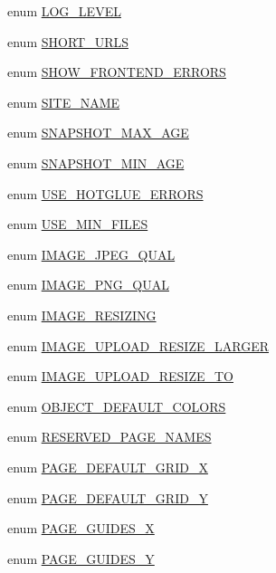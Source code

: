 \begin{DoxyCompactItemize}
\item 
enum \hyperlink{config_8inc_8php_aa5a9053636a30269210c54e734e0d583}{LOG\_\-LEVEL} 
\item 
enum \hyperlink{config_8inc_8php_a377ac3321785e25215435e8d9802bc34}{SHORT\_\-URLS} 
\item 
enum \hyperlink{config_8inc_8php_a71022f94adb600e3984795805fe7f8d0}{SHOW\_\-FRONTEND\_\-ERRORS} 
\item 
enum \hyperlink{config_8inc_8php_a38f8e1265350d7091b55f4cffe629f3a}{SITE\_\-NAME} 
\item 
enum \hyperlink{config_8inc_8php_aa9c8d739795b1000f6ea105992a4e488}{SNAPSHOT\_\-MAX\_\-AGE} 
\item 
enum \hyperlink{config_8inc_8php_a7fb94ff6aaa61e964fe2f90f738d5cb3}{SNAPSHOT\_\-MIN\_\-AGE} 
\item 
enum \hyperlink{config_8inc_8php_a4be2ca4abd0486feb76708f3cf7e671d}{USE\_\-HOTGLUE\_\-ERRORS} 
\item 
enum \hyperlink{config_8inc_8php_a98806af9de0ea41a958d26c7e06b26a9}{USE\_\-MIN\_\-FILES} 
\item 
enum \hyperlink{config_8inc_8php_af27e0280ef96e9b1d2d968a0d2d208ff}{IMAGE\_\-JPEG\_\-QUAL} 
\item 
enum \hyperlink{config_8inc_8php_a3e161cc5c717f2e23d89b69ec297af9b}{IMAGE\_\-PNG\_\-QUAL} 
\item 
enum \hyperlink{config_8inc_8php_a0654894e46ca07417a6e85e091ed7d1d}{IMAGE\_\-RESIZING} 
\item 
enum \hyperlink{config_8inc_8php_a009a803b2fcec74eb8fd6b90dfebd680}{IMAGE\_\-UPLOAD\_\-RESIZE\_\-LARGER} 
\item 
enum \hyperlink{config_8inc_8php_a86484d4f8051155268e7c23ac4d1f5f4}{IMAGE\_\-UPLOAD\_\-RESIZE\_\-TO} 
\item 
enum \hyperlink{config_8inc_8php_a3e205a45d91d7ef191e53487b6b48b3b}{OBJECT\_\-DEFAULT\_\-COLORS} 
\item 
enum \hyperlink{config_8inc_8php_a9b61a7295e29797458d957ae0640c601}{RESERVED\_\-PAGE\_\-NAMES} 
\item 
enum \hyperlink{config_8inc_8php_abc1c54acdbce897c718854b663517cf9}{PAGE\_\-DEFAULT\_\-GRID\_\-X} 
\item 
enum \hyperlink{config_8inc_8php_ab93c5dcea5ef58747b80594c3d9304d7}{PAGE\_\-DEFAULT\_\-GRID\_\-Y} 
\item 
enum \hyperlink{config_8inc_8php_a81167deb206874270a59273141919fe5}{PAGE\_\-GUIDES\_\-X} 
\item 
enum \hyperlink{config_8inc_8php_a3f78eb981e05f649bfff403c0e595d0b}{PAGE\_\-GUIDES\_\-Y} 

\end{DoxyCompactItemize}
